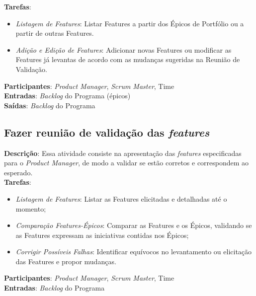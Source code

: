\textbf{Tarefas}:

  \begin{itemize}
   \item \indent \textit{Listagem de Features}:  Listar Features a partir dos Épicos de Portfólio ou a partir de outras Features.

   \item \indent \textit{Adição e Edição de Features}: Adicionar novas Features ou modificar as Features já levantas de acordo com as mudanças sugeridas na Reunião de Validação.
  \end{itemize}

\textbf{Participantes}: \textit{Product Manager}, \textit{Scrum Master}, Time \\

\textbf{Entradas}: \textit{Backlog} do Programa (épicos) \\

\textbf{Saídas}:   \textit{Backlog} do Programa \\

\subsection{Fazer reunião de validação das \textit{features}}
  \textbf{Descrição}: Essa atividade consiste na apresentação das \textit{features} especificadas para o \textit{Product Manager}, de modo a validar se
  estão corretos e correspondem ao esperado.  \\

  \textbf{Tarefas}:
  \begin{itemize}
   \item \indent \textit{Listagem de Features}: Listar as Features elicitadas e detalhadas até o momento;

   \item \indent \textit{Comparação Features-Épicos}: Comparar as Features e os Épicos, validando se as Features expressam as iniciativas contidas nos Épicos;

   \item \indent \textit{Corrigir Possíveis Falhas}: Identificar equívocos no levantamento ou elicitação das Features e propor mudanças.
  \end{itemize}

  \textbf{Participantes}: \textit{Product Manager}, \textit{Scrum Master}, Time \\

  \textbf{Entradas}: \textit{Backlog} do Programa \\

